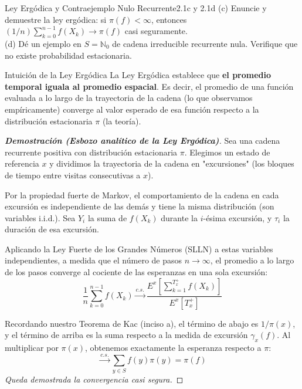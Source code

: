 \documentclass[10pt,a4paper]{article}
\begin{document}
\newpage

\vspace{5mm}

\begin{ejercicio}{Ley Ergódica y Contraejemplo Nulo Recurrente}{2.1c y 2.1d}
    (c) Enuncie y demuestre la ley ergódica: si $\pi(f) < \infty$, entonces $(1/n) \sum_{k=0}^{n-1} f(X_k) \to \pi(f)$ casi seguramente. \\
    (d) Dé un ejemplo en $S = \mathbb{N}_0$ de cadena irreducible recurrente nula. Verifique que no existe probabilidad estacionaria.
\end{ejercicio}

\vspace{2mm}

\begin{nota}{Intuición de la Ley Ergódica}
    La Ley Ergódica establece que \textbf{el promedio temporal iguala al promedio espacial}. Es decir, el promedio de una función evaluada a lo largo de la trayectoria de la cadena (lo que observamos empíricamente) converge al valor esperado de esa función respecto a la distribución estacionaria $\pi$ (la teoría).
\end{nota}

\begin{proof}[\textbf{Demostración (Esbozo analítico de la Ley Ergódica)}]
    Sea una cadena recurrente positiva con distribución estacionaria $\pi$. Elegimos un estado de referencia $x$ y dividimos la trayectoria de la cadena en "excursiones" (los bloques de tiempo entre visitas consecutivas a $x$).
    
    Por la propiedad fuerte de Markov, el comportamiento de la cadena en cada excursión es independiente de las demás y tiene la misma distribución (son variables i.i.d.).
    Sea $Y_i$ la suma de $f(X_k)$ durante la $i$-ésima excursión, y $\tau_i$ la duración de esa excursión.
    
    Aplicando la Ley Fuerte de los Grandes Números (SLLN) a estas variables independientes, a medida que el número de pasos $n \to \infty$, el promedio a lo largo de los pasos converge al cociente de las esperanzas en una sola excursión:
    \[ \frac{1}{n} \sum_{k=0}^{n-1} f(X_k) \xrightarrow{c.s.} \frac{E^x\left[ \sum_{k=1}^{T_x^+} f(X_k) \right]}{E^x[T_x^+]} \]
    
    Recordando nuestro Teorema de Kac (inciso a), el término de abajo es $1/\pi(x)$, y el término de arriba es la suma respecto a la medida de excursión $\gamma_x(f)$. Al multiplicar por $\pi(x)$, obtenemos exactamente la esperanza respecto a $\pi$:
    \[ \xrightarrow{c.s.} \sum_{y \in S} f(y) \pi(y) = \pi(f) \]
    \textit{Queda demostrada la convergencia casi segura.}
\end{proof}
\end{document}

